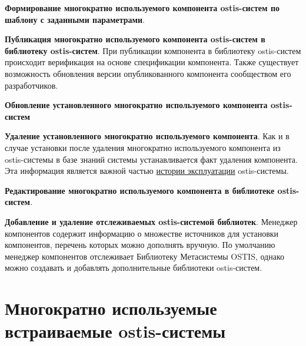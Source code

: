 \begin{textitemize}
	\item{\textbf{Формирование многократно используемого компонента ostis-систем по шаблону с заданными параметрами}.}
	\item{\textbf{Публикация многократно используемого компонента ostis-систем в библиотеку ostis-систем}. При публикации компонента в библиотеку ostis-систем происходит верификация на основе спецификации компонента. Также существует возможность обновления версии опубликованного компонента сообществом его разработчиков.}
	\item{\textbf{Обновление установленного многократно используемого компонента ostis-систем}}
	\item{\textbf{Удаление установленного многократно используемого компонента}. Как и в случае установки после удаления многократно используемого компонента из ostis-системы в базе знаний системы устанавливается факт удаления компонента. Эта информация является важной частью \underline{истории эксплуатации} ostis-системы.}
	\item{\textbf{Редактирование многократно используемого компонента в библиотеке ostis-систем}.}
	\item{\textbf{Добавление и удаление отслеживаемых ostis-системой библиотек}. Менеджер компонентов содержит информацию о множестве источников для установки компонентов, перечень которых можно дополнять вручную. По умолчанию менеджер компонентов отслеживает Библиотеку Метасистемы OSTIS, однако можно создавать и добавлять дополнительные библиотеки ostis-систем.}
\end{textitemize}

\section{Многократно используемые встраиваемые ostis-системы}
\label{ostis_library_embedded_systems}

%